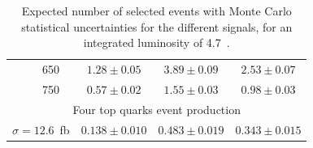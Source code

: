\begin{table}[p]
\begin{center}
\begin{tabular}{c|c|c|c|c}
      & 650 & $1.28 \pm 0.05$ & $3.89  \pm 0.09$ & $2.53  \pm 0.07$ \\
      & 750 & $0.57 \pm 0.02$ & $1.55  \pm 0.03$ & $0.98  \pm 0.03$ \\
      \hline
      \multicolumn{5}{c}{Four top quarks event production} \\
      \hline
      \multicolumn{2}{c|}{$\sigma=12.6$~fb} & $0.138 \pm 0.010$ & $0.483\pm 0.019$& $0.343\pm 0.015$\\
      \hline
    \end{tabular}
    \caption{Expected number of selected events with Monte Carlo statistical uncertainties 
      for the different signals, for an integrated luminosity of 4.7~\ifb{}.}\label{yieldsignal}
  \end{center}
\end{table}



